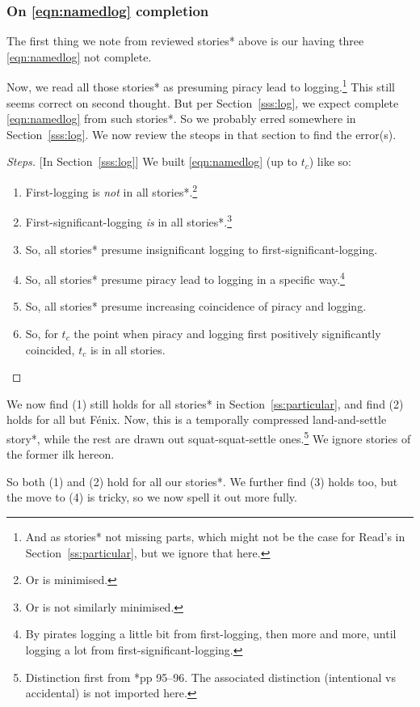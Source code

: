 \documentclass{amsart}
\theoremstyle{definition}
\theoremstyle{remark}
\newenvironment{steps}{\begin{proof}[Steps]}{\end{proof}} %
\begin{document}
		\subsubsection{On \ref{eqn:namedlog} completion}
		\label{sss:onnolog}
		The first thing we note from reviewed stories* above is our having three \ref{eqn:namedlog} not complete.
		
		Now, we read all those stories* as presuming piracy lead to logging.\footnote{And as stories* not missing parts, which might not be the case for Read's in Section~\ref{ss:particular}, but we ignore that here.} This still seems correct on second thought. But per Section~\ref{sss:log}, we expect complete \ref{eqn:namedlog} from such stories*. So we probably erred somewhere in Section~\ref{sss:log}. We now review the steops in that section to find the error(s).
		\begin{steps}[In Section~\ref{sss:log}]
		We built \ref{eqn:namedlog} (up to \(t_c\)) like so:
		\begin{enumerate}
		\item First-logging is \emph{not} in all stories*.\footnote{Or is minimised.}
		\item First-significant-logging \emph{is} in all stories*.\footnote{Or is not similarly minimised.}
		\item So, all stories* presume insignificant logging to first-significant-logging.
		\item So, all stories* presume piracy lead to logging in a specific way.\footnote{By pirates logging a little bit from first-logging, then more and more, until logging a lot from first-significant-logging.}
		\item So, all stories* presume increasing coincidence of piracy and logging.
		\item So, for \(t_c\) the point when piracy and logging first positively significantly coincided, \(t_c\) is in all stories.
		\qedhere %
		\end{enumerate}
		\end{steps}
		We now find (1) still holds for all stories* in Section~\ref{ss:particular}, and find (2) holds for all but Fénix. Now, this is a temporally compressed land-and-settle story*, while the rest are drawn out squat-squat-settle ones.\footnote{Distinction first from \cite{cam11}*{pp 95--96}. The associated distinction (intentional vs accidental) is not imported here.} We ignore stories of the former ilk hereon.
		
		So both (1) and (2) hold for all our stories*. We further find (3) holds too, but the move to (4) is tricky, so we now spell it out more fully.
		
\end{document}
